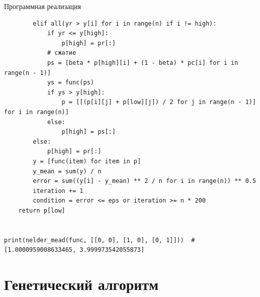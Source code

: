 \documentclass[aspectratio=169, mathserif]{beamer}	%
\begin{document}
\begin{frame}[fragile]{Программная реализация}
\scriptsize
\begin{verbatim}
        elif all(yr > y[i] for i in range(n) if i != high):
            if yr <= y[high]:
                p[high] = pr[:]
            # сжатие
            ps = [beta * p[high][i] + (1 - beta) * pc[i] for i in range(n - 1)]
            ys = func(ps)
            if ys > y[high]:
                p = [[(p[i][j] + p[low][j]) / 2 for j in range(n - 1)] for i in range(n)]
            else:
                p[high] = ps[:]
        else:
            p[high] = pr[:]
        y = [func(item) for item in p]
        y_mean = sum(y) / n
        error = sum((y[i] - y_mean) ** 2 / n for i in range(n)) ** 0.5
        iteration += 1
        condition = error <= eps or iteration >= n * 200
    return p[low]


print(nelder_mead(func, [[0, 0], [1, 0], [0, 1]]))  # [1.0000959008633465, 3.999973542055873]
\end{verbatim}
\vfill
\end{frame}


\section{Генетический алгоритм}
\sectionframe
\end{document}
